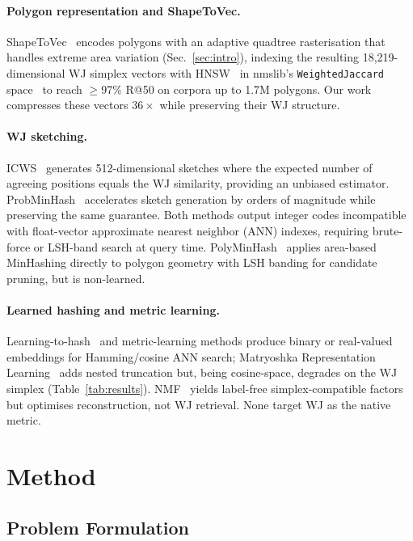 \documentclass[sigconf]{acmart}
\begin{document}
\paragraph{Polygon representation and ShapeToVec.}
ShapeToVec~\cite{shape2vec} encodes polygons with an adaptive quadtree
rasterisation that handles extreme area variation (Sec.~\ref{sec:intro}),
indexing the resulting 18{,}219-dimensional WJ simplex vectors with
HNSW~\cite{hnsw20} in nmslib's \texttt{WeightedJaccard} space~\cite{shape2vec}
to reach $\geq$97\% R@50 on corpora up to 1.7M polygons. Our
work compresses these vectors $36\times$ while preserving their WJ structure.

\paragraph{WJ sketching.}
ICWS~\cite{ioffe10} generates 512-dimensional sketches where the expected number
of agreeing positions equals the WJ similarity, providing an unbiased estimator.
ProbMinHash~\cite{probminhash20} accelerates sketch generation by orders of
magnitude while preserving the same guarantee.
Both methods output integer codes incompatible with float-vector approximate nearest
neighbor (ANN) indexes, requiring brute-force or LSH-band search at query time.
PolyMinHash~\cite{polyminhash25} applies area-based MinHashing directly to polygon
geometry with LSH banding for candidate pruning, but is non-learned.

\paragraph{Learned hashing and metric learning.}
Learning-to-hash~\cite{hashsurvey14,deephashsurvey22} and metric-learning methods
produce binary or real-valued embeddings for Hamming/cosine ANN search; Matryoshka
Representation Learning~\cite{matryoshka22} adds nested truncation but, being
cosine-space, degrades on the WJ simplex (Table~\ref{tab:results}).
NMF~\cite{nmf99} yields label-free simplex-compatible factors but optimises
reconstruction, not WJ retrieval. None target WJ as the native metric.

\section{Method}

\subsection{Problem Formulation}
\end{document}
